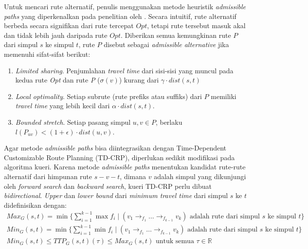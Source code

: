 Untuk mencari rute alternatif, penulis menggunakan metode heuristik \textit{admissible paths} yang diperkenalkan pada penelitian oleh \cite{Abraham2010}. Secara intuitif, rute alternatif berbeda secara signifikan dari rute tercepat $Opt$, tetapi rute tersebut masuk akal dan tidak lebih jauh daripada rute $Opt$. Diberikan semua kemungkinan rute $P$ dari simpul $s$ ke simpul $t$, rute $P$ disebut sebagai \textit{admissible alternative} jika memenuhi sifat-sifat berikut:
\begin{enumerate}
    \item \textit{Limited sharing}. Penjumlahan \textit{travel time} dari sisi-sisi yang muncul pada kedua rute \textit{Opt} dan rute \textit{P} ($\sigma(v)$) kurang dari $\gamma \cdot dist(s,t)$ 
    \item \textit{Local optimality}. Setiap subrute (rute prefiks atau suffiks) dari $P$ memiliki \textit{travel time} yang lebih kecil dari $\alpha \cdot dist(s,t)$.
    \item \textit{Bounded stretch}. Setiap pasang simpul $u,v\in P$, berlaku $l(P_{uv})< (1+\epsilon)\cdot dist(u,v)$. 
\end{enumerate}

Agar metode \textit{admissible paths} bisa diintegrasikan dengan Time-Dependent Customizable Route Planning (TD-CRP), diperlukan sedikit modifikasi pada algoritma kueri. Karena metode \textit{admissible paths} menentukan kandidat rute-rute alternatif dari himpunan rute $s-v-t$, dimana $v$ adalah simpul yang dikunjungi oleh \textit{forward search} dan \textit{backward search}, kueri TD-CRP perlu dibuat \textit{bidirectional}. \textit{Upper} dan \textit{lower bound} dari \textit{minimum travel time } dari simpul $s$ ke $t$ didefinisikan dengan:
\begin{align}
    Max_{G}(s,t)=\min \{ \sum_{i=1}^{k-1} \max f_i \mid (v_1 \rightarrow_{f_1} \ldots \rightarrow_{f_{k-1}} v_k ) \text{ adalah rute dari simpul } s \text{ ke simpul } t \} \\ 
    Min_{G}(s,t)=\min \{ \sum_{i=1}^{k-1} \min f_i \mid (v_1 \rightarrow_{f_1} \ldots \rightarrow_{f_{k-1}} v_k ) \text{ adalah rute dari simpul } s \text{ ke simpul } t \} \\
    Min_{G}(s,t)\leq TTP_G(s,t)(\tau)\leq Max_G(s,t) \text{ untuk semua } \tau\in \mathbb{R}
\end{align}



